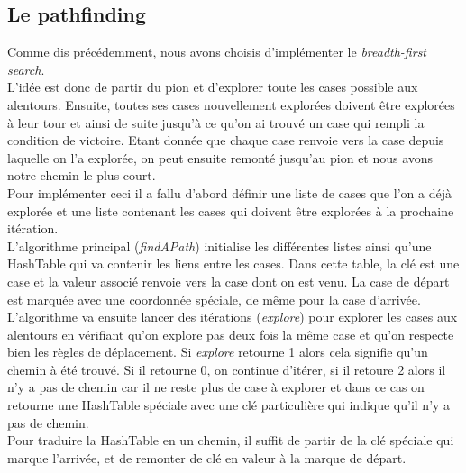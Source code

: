 \documentclass[a4paper, 12pt]{article}
\begin{document}
\subsection{Le pathfinding}
Comme dis précédemment, nous avons choisis d'implémenter le \textit{breadth-first search}. \\
L'idée est donc de partir du pion et d'explorer toute les cases possible aux alentours. Ensuite, toutes ses cases nouvellement explorées doivent être explorées à leur tour et ainsi de suite jusqu'à ce qu'on ai trouvé un case qui rempli la condition de victoire. Etant donnée que chaque case renvoie vers la case depuis laquelle on l'a explorée, on peut ensuite remonté jusqu'au pion et nous avons notre chemin le plus court. \\
Pour implémenter ceci il a fallu d'abord définir une liste de cases que l'on a déjà explorée et une liste contenant les cases qui doivent être explorées à la prochaine itération. \\
L'algorithme principal (\textit{findAPath}) initialise les différentes listes ainsi qu'une HashTable qui va contenir les liens entre les cases. Dans cette table, la clé est une case et la valeur associé renvoie vers la case dont on est venu. La case de départ est marquée avec une coordonnée spéciale, de même pour la case d'arrivée. L'algorithme va ensuite lancer des itérations (\textit{explore}) pour explorer les cases aux alentours en vérifiant qu'on explore pas deux fois la même case et qu'on respecte bien les règles de déplacement. Si \textit{explore} retourne 1 alors cela signifie qu'un chemin à été trouvé. Si il retourne 0, on continue d'itérer, si il retoure 2 alors il n'y a pas de chemin car il ne reste plus de case à explorer et dans ce cas on retourne une HashTable spéciale avec une clé particulière qui indique qu'il n'y a pas de chemin.\\
Pour traduire la HashTable en un chemin, il suffit de partir de la clé spéciale qui marque l'arrivée, et de remonter de clé en valeur à la marque de départ.
\end{document}
